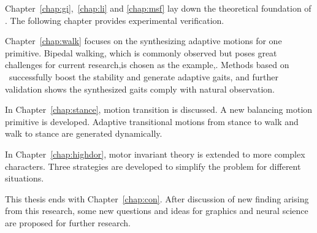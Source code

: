 Chapter~\ref{chap:gi},~\ref{chap:li} and \ref{chap:msf} lay down the theoretical foundation of {\moit}.
The following chapter provides experimental verification.



Chapter~\ref{chap:walk} focuses on the synthesizing adaptive motions for one primitive.
Bipedal walking,  which is commonly observed but poses great challenges for current \cms research,is chosen as the example,.
Methods based on {\moit}\ successfully boost the stability and generate adaptive gaits, and further validation shows the synthesized gaits comply with natural observation. 

In Chapter~\ref{chap:stance}, motion transition is discussed. 
A new balancing motion primitive is developed. 
Adaptive transitional motions from stance to walk and walk to stance are generated dynamically.


In Chapter~\ref{chap:highdor}, motor invariant theory is extended to more complex characters.
Three strategies are developed to simplify the problem for different situations.

This thesis ends with Chapter~\ref{chap:con}. 
After discussion of new finding arising from this research, some new questions and ideas for graphics and neural science are proposed for further research.








